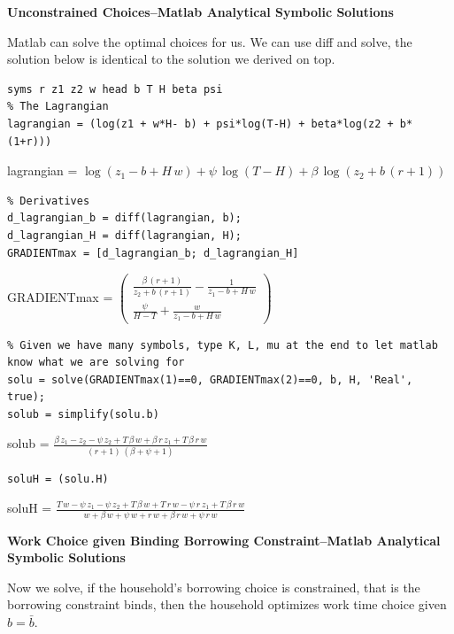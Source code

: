 \documentclass[
]{book}
\begin{document}
\textbf{Unconstrained Choices--Matlab Analytical Symbolic Solutions}

Matlab can solve the optimal choices for us. We can use diff and solve,
the solution below is identical to the solution we derived on top.

\begin{verbatim}
syms r z1 z2 w head b T H beta psi
% The Lagrangian
lagrangian = (log(z1 + w*H- b) + psi*log(T-H) + beta*log(z2 + b*(1+r)))
\end{verbatim}

lagrangian =
\(\displaystyle \log \left(z_1 -b+H\,w\right)+\psi \,\log \left(T-H\right)+\beta \,\log \left(z_2 +b\,{\left(r+1\right)}\right)\)

\begin{verbatim}
% Derivatives
d_lagrangian_b = diff(lagrangian, b);
d_lagrangian_H = diff(lagrangian, H);
GRADIENTmax = [d_lagrangian_b; d_lagrangian_H]
\end{verbatim}

GRADIENTmax = \(\displaystyle \left(\begin{array}{c} \frac{\beta \,{\left(r+1\right)}}{z_2 +b\,{\left(r+1\right)}}-\frac{1}{z_1 -b+H\,w}\\ \frac{\psi }{H-T}+\frac{w}{z_1 -b+H\,w} \end{array}\right)\)

\begin{verbatim}
% Given we have many symbols, type K, L, mu at the end to let matlab know what we are solving for
solu = solve(GRADIENTmax(1)==0, GRADIENTmax(2)==0, b, H, 'Real', true);
solub = simplify(solu.b)
\end{verbatim}

solub =
\(\displaystyle \frac{\beta \,z_1 -z_2 -\psi \,z_2 +T\,\beta \,w+\beta \,r\,z_1 +T\,\beta \,r\,w}{{\left(r+1\right)}\,{\left(\beta +\psi +1\right)}}\)

\begin{verbatim}
soluH = (solu.H)
\end{verbatim}

soluH =
\(\displaystyle \frac{T\,w-\psi \,z_1 -\psi \,z_2 +T\,\beta \,w+T\,r\,w-\psi \,r\,z_1 +T\,\beta \,r\,w}{w+\beta \,w+\psi \,w+r\,w+\beta \,r\,w+\psi \,r\,w}\)

\textbf{Work Choice given Binding Borrowing Constraint--Matlab Analytical
Symbolic Solutions}

Now we solve, if the household's borrowing choice is constrained, that
is the borrowing constraint binds, then the household optimizes work
time choice given \(b=\bar{b}\).
\end{document}
